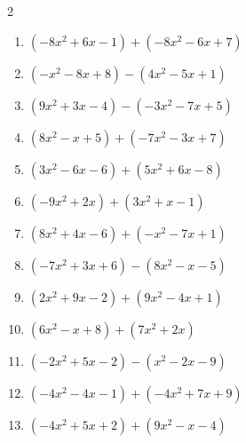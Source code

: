 \begin{multicols}{2}
\begin{enumerate}

\columnbreak %

\resetques

  \item $(-8x^{2}+6x-1)+(-8x^{2}-6x+7)$


  \item $(-x^{2}-8x+8)-(4x^{2}-5x+1)$


  \item $(9x^{2}+3x-4)-(-3x^{2}-7x+5)$


  \item $(8x^{2}-x+5)+(-7x^{2}-3x+7)$


  \item $(3x^{2}-6x-6)+(5x^{2}+6x-8)$


  \item $(-9x^{2}+2x)+(3x^{2}+x-1)$


  \item $(8x^{2}+4x-6)+(-x^{2}-7x+1)$


  \item $(-7x^{2}+3x+6)-(8x^{2}-x-5)$


  \item $(2x^{2}+9x-2)+(9x^{2}-4x+1)$


  \item $(6x^{2}-x+8)+(7x^{2}+2x)$


  \item $(-2x^{2}+5x-2)-(x^{2}-2x-9)$


  \item $(-4x^{2}-4x-1)+(-4x^{2}+7x+9)$


  \item $(-4x^{2}+5x+2)+(9x^{2}-x-4)$


\end{enumerate}
\end{multicols}
